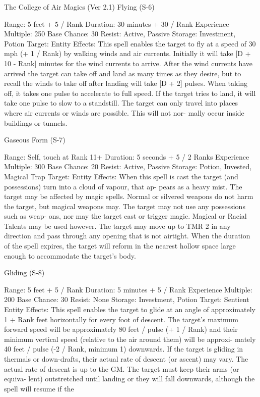 \begin{Chapter}{The College of Air Magics (Ver 2.1)}
Flying (S-6) 

Range: 5 feet + 5 / Rank 
Duration: 30 minutes + 30 / Rank 
Experience Multiple: 250 
Base Chance: 30%
Resist: Active, Passive 
Storage: Investment, Potion 
Target: Entity 
Effects:  This  spell  enables  the  target  to  fly  at  a 
speed  of  30  mph  (+  1  /  Rank)  by  walking  winds 
and  air  currents.  Initially  it  will  take  [D  +  10  - 
Rank]  minutes  for  the  wind  currents  to  arrive. 
After the wind currents have arrived the target can 
take off and land as many times as they desire, but 
to  recall  the  winds  to  take  off  after  landing  will 
take  [D  + 2]  pulses.  When  taking  off,  it takes  one 
pulse  to  accelerate  to  full  speed.  If  the  target  tries 
to land, it will take one pulse to slow to a standstill. 
The  target  can  only  travel  into  places  where  air 
currents  or  winds  are  possible.  This  will  not  nor-
mally occur inside buildings or tunnels. 

Gaseous Form (S-7) 

Range: Self, touch at Rank 11+ 
Duration: 5 seconds + 5 / 2 Ranks 
Experience Multiple: 300 
Base Chance: 20%
Resist: Active, Passive 
Storage: Potion, Invested, Magical Trap 
Target: Entity 
Effects:  When  this  spell  is  cast  the  target  (and 
possessions)  turn  into  a  cloud  of  vapour,  that  ap-
pears  as  a  heavy  mist.  The  target  may  be  affected 
by  magic  spells.  Normal  or  silvered  weapons  do 
not harm the target, but magical weapons may. The 
target  may  not  use  any  possessions  such  as  weap-
ons,  nor  may  the  target  cast  or  trigger  magic. 
Magical  or  Racial  Talents  may  be  used  however. 
The target may move up to TMR 2 in any direction 
and  pass  through  any  opening  that  is  not  airtight. 
When  the  duration  of  the  spell  expires,  the  target 
will  reform  in  the  nearest  hollow  space  large 
enough to accommodate the target’s body. 

Gliding (S-8) 

Range: 5 feet + 5 / Rank 
Duration: 5 minutes + 5 / Rank 
Experience Multiple: 200 
Base Chance: 30%
Resist: None 
Storage: Investment, Potion 
Target: Sentient Entity 
Effects: This spell  enables the target to glide at an 
angle  of  approximately  1  + Rank  feet  horizontally 
for  every  foot  of  descent.  The  target’s  maximum 
forward speed will be approximately 80 feet / pulse 
(+  1  /  Rank)  and  their  minimum  vertical  speed 
(relative  to  the  air  around  them)  will  be  approxi-
mately  40  feet  /  pulse  (-2  /  Rank,  minimum  1) 
downwards.  If  the  target  is  gliding  in  thermals  or 
down-drafts, their actual rate of descent (or ascent) 
may  vary.  The  actual  rate  of  descent  is  up  to  the 
GM.  The  target  must  keep  their  arms  (or  equiva-
lent)  outstretched  until  landing  or  they  will  fall 
downwards,  although  the  spell  will  resume  if  the 


\end{Chapter}
